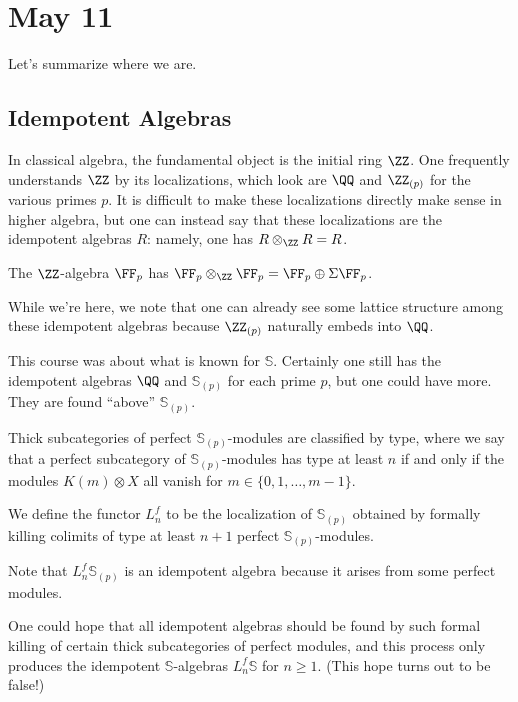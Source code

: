 \documentclass[../notes.tex]{subfiles}
\begin{document}
\section{May 11}
Let's summarize where we are.

\subsection{Idempotent Algebras}
In classical algebra, the fundamental object is the initial ring $\ZZ$. One frequently understands $\ZZ$ by its localizations, which look are $\QQ$ and $\ZZ_{(p)}$ for the various primes $p$. It is difficult to make these localizations directly make sense in higher algebra, but one can instead say that these localizations are the idempotent algebras $R$: namely, one has $R\otimes_\ZZ R=R$.
\begin{nex}
	The $\ZZ$-algebra $\FF_p$ has $\FF_p\otimes_\ZZ\FF_p=\FF_p\oplus\Sigma\FF_p$.
\end{nex}
While we're here, we note that one can already see some lattice structure among these idempotent algebras because $\ZZ_{(p)}$ naturally embeds into $\QQ$.

This course was about what is known for $\mathbb S$. Certainly one still has the idempotent algebras $\QQ$ and $\mathbb S_{(p)}$ for each prime $p$, but one could have more. They are found ``above'' $\mathbb S_{(p)}$.
\begin{theorem} \label{thm:thick-subcat}
	Thick subcategories of perfect $\mathbb S_{(p)}$-modules are classified by type, where we say that a perfect subcategory of $\mathbb S_{(p)}$-modules has type at least $n$ if and only if the modules $K(m)\otimes X$ all vanish for $m\in\{0,1,\ldots,m-1\}$.
\end{theorem}
\begin{definition}
	We define the functor $L_n^f$ to be the localization of $\mathbb S_{(p)}$ obtained by formally killing colimits of type at least $n+1$ perfect $\mathbb S_{(p)}$-modules.
\end{definition}
\begin{remark}
	Note that $L_n^f\mathbb S_{(p)}$ is an idempotent algebra because it arises from some perfect modules.
\end{remark}
One could hope that all idempotent algebras should be found by such formal killing of certain thick subcategories of perfect modules, and this process only produces the idempotent $\mathbb S$-algebras $L_n^f\mathbb S$ for $n\ge1$. (This hope turns out to be false!)
\end{document}
